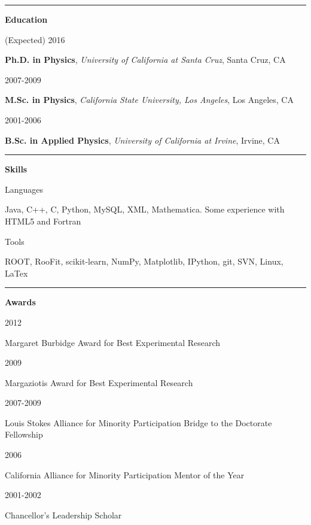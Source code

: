 \documentclass[10pt]{article}
\newcommand{\resumesection}[1] {
    \noindent
    \textcolor{indigodye}{\rule{.15\textwidth}{.1in} \hspace{0.01 \textwidth} \textbf{\Large{#1}}} \newline
}
\newcommand{\educationentry}[4] { 
    \noindent
    \begin{minipage}[t]{0.15\textwidth} \begin{flushright} #1 \end{flushright} \end{minipage} \hspace{0.01\textwidth}
    \begin{minipage}[t]{0.84\textwidth} 
        \textbf{#2}, \emph{#3}, #4
    \end{minipage}
}
\newcommand{\skillsentry}[2] { 
    \noindent
    \begin{minipage}[t]{0.15\textwidth} \begin{flushright} #1 \end{flushright} \end{minipage} \hspace{0.01\textwidth}
    \begin{minipage}[t]{0.84\textwidth} #2 \end{minipage}
}
\newcommand{\awardentry}[2] { 
    \noindent
    \begin{minipage}[t]{0.15\textwidth} \begin{flushright} #1 \end{flushright} \end{minipage} \hspace{0.01\textwidth}
    \begin{minipage}[t]{0.84\textwidth} #2 \end{minipage}
}
\begin{document}
    \resumesection{Education}
        \educationentry{(Expected) 2016}
                       {Ph.D. in Physics}
                       {University of California at Santa Cruz}
                       {Santa Cruz, CA}
        \educationentry{2007-2009}
                       {M.Sc. in Physics}
                       {California State University, Los Angeles}
                       {Los Angeles, CA}
        \educationentry{2001-2006}
                       {B.Sc. in Applied Physics}
                       {University of California at Irvine}
                       {Irvine, CA}

    \resumesection{Skills}
    \skillsentry{Languages}{Java, C++, C, Python, MySQL, XML, Mathematica. Some experience with HTML5 and Fortran}
        \skillsentry{Tools}{ROOT, RooFit, scikit-learn, NumPy, Matplotlib, IPython, git, SVN, Linux, LaTex}

    \resumesection{Awards}
        \awardentry{2012}{Margaret Burbidge Award for Best Experimental Research}
        \awardentry{2009}{Margaziotis Award for Best Experimental Research}
        \awardentry{2007-2009}{Louis Stokes Alliance for Minority Participation Bridge to the Doctorate 
                               Fellowship}
        \awardentry{2006}{California Alliance for Minority Participation Mentor of the Year}
        \awardentry{2001-2002}{Chancellor's Leadership Scholar}
\end{document}
